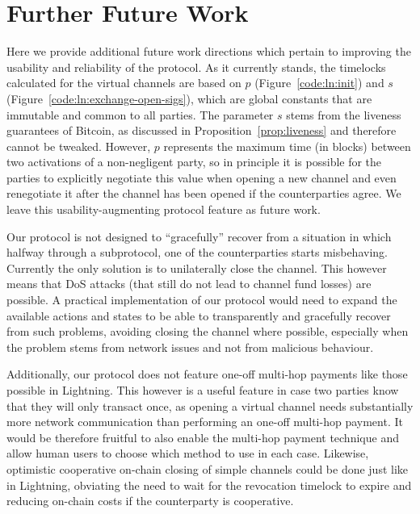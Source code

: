 \section{Further Future Work}
\label{sec:further-future-work}
  Here we provide additional future work directions which pertain to improving
  the usability and reliability of the protocol. As it currently stands, the
  timelocks calculated for the virtual channels are based on $p$
  (Figure~\ref{code:ln:init}) and $s$ (Figure~\ref{code:ln:exchange-open-sigs}),
  which are global constants that are immutable and common to all parties. The
  parameter $s$ stems from the liveness guarantees of Bitcoin, as discussed in
  Proposition~\ref{prop:liveness} and therefore cannot be tweaked. However, $p$
  represents the maximum time (in blocks) between two activations of a
  non-negligent party, so in principle it is possible for the parties to
  explicitly negotiate this value when opening a new channel and even
  renegotiate it after the channel has been opened if the counterparties agree.
  We leave this usability-augmenting protocol feature as future work.

  Our protocol is not designed to ``gracefully'' recover from a situation in
  which halfway through a subprotocol, one of the counterparties starts
  misbehaving. Currently the only solution is to unilaterally close the channel.
  This however means that DoS attacks (that still do not lead to channel fund
  losses) are possible. A practical implementation of our protocol would need to
  expand the available actions and states to be able to transparently and
  gracefully recover from such problems, avoiding closing the channel where
  possible, especially when the problem stems from network issues and not from
  malicious behaviour.

  Additionally, our protocol does not feature one-off multi-hop payments like
  those possible in Lightning. This however is a useful feature in case two
  parties know that they will only transact once, as opening a virtual channel
  needs substantially more network communication than performing an one-off
  multi-hop payment. It would be therefore fruitful to also enable the multi-hop
  payment technique and allow human users to choose which method to use in each
  case. Likewise, optimistic cooperative on-chain closing of simple channels
  could be done just like in Lightning, obviating the need to wait for the
  revocation timelock to expire and reducing on-chain costs if the counterparty
  is cooperative.
